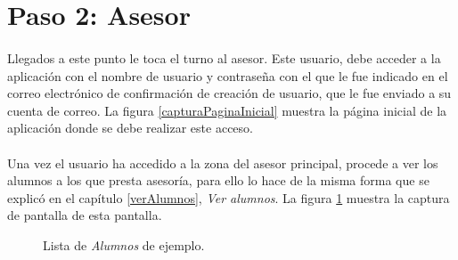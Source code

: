 \section{Paso 2: Asesor}

  \paragraph{}Llegados a este punto le toca el turno al asesor. Este usuario,
  debe acceder a la aplicación con el nombre de usuario y contraseña con el que
  le fue indicado en el correo electrónico de confirmación de creación de
  usuario, que le fue enviado a su cuenta de correo. La figura
  \ref{capturaPaginaInicial} muestra la página inicial de la aplicación donde se
  debe realizar este acceso.

  \paragraph{}Una vez el usuario ha accedido a la zona del asesor
  principal, procede a ver los alumnos a los que presta asesoría, para ello lo
  hace de la misma forma que se explicó en el capítulo \ref{verAlumnos},
  \textit{Ver alumnos}. La figura \ref{ejemploVerAlumnos} muestra la captura
  de pantalla de esta pantalla.

  \begin{figure}[!ht]
    \begin{center}
      \caption{Lista de \textit{Alumnos} de ejemplo.}
      \label{ejemploVerAlumnos}
    \end{center}
  \end{figure}